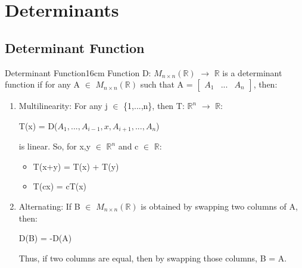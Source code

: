 \newpage

\section[Day 4: Determinants]{ Determinants }

\subsection{ Determinant Function }

    \begin{definition}{Determinant Function}{16cm}
        Function D: $M_{n \times n}(\mathbb{R})$ $\rightarrow$ $\mathbb{R}$
        is a {\color{lblue} determinant function} if
        for any A $\in$ $M_{n \times n}(\mathbb{R})$
        such that A =
        $\begin{bmatrix}
            A_1 & ... & A_n
        \end{bmatrix}$, then:

        \begin{enumerate}[label=(\alph*), leftmargin=1cm, itemsep=0.1cm]
            \item {\color{lgreen} Multilinearity}:
                For any j $\in$ \{1,...,n\}, then
                T: $\mathbb{R}^n$ $\rightarrow$ $\mathbb{R}$:
                
                \hspace{0.5cm}
                T(x) = D($A_1,...,A_{i-1},x,A_{i+1},...,A_n$)

                is linear. So, for x,y $\in$ $\mathbb{R}^n$
                and c $\in$ $\mathbb{R}$:

                \begin{itemize}
                    \item T(x+y) = T(x) + T(y)
                    
                    \item T(cx) = cT(x)
                \end{itemize}

            \item {\color{lgreen} Alternating}:
                If B $\in$ $M_{n \times n}(\mathbb{R})$ is obtained by
                swapping two columns of A, then:

                \hspace{0.5cm}
                D(B) = -D(A)

                Thus, if two columns are equal, then
                by swapping those columns, B = A.


\end{enumerate}
\end{definition}
